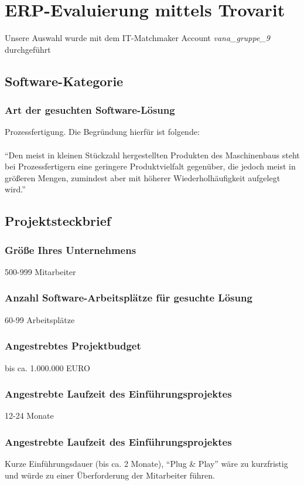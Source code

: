 \section{ERP-Evaluierung mittels Trovarit}
Unsere Auswahl wurde mit dem IT-Matchmaker Account \textit{vana\_gruppe\_9} durchgeführt


\subsection{Software-Kategorie}
\subsubsection{Art der gesuchten Software-Lösung}
\label{sssec_art}
Prozessfertigung. Die Begründung hierfür ist folgende:\\\\
\enquote{Den meist in kleinen Stückzahl hergestellten Produkten des Maschinenbaus steht bei Prozessfertigern eine geringere Produktvielfalt gegenüber, die jedoch meist in größeren Mengen, zumindest aber mit höherer Wiederholhäufigkeit aufgelegt wird.} \cite{trovarit_prozessfertigung}

\subsection{Projektsteckbrief}
\subsubsection{Größe Ihres Unternehmens}
500-999 Mitarbeiter
\subsubsection{Anzahl Software-Arbeitsplätze für gesuchte Lösung}
60-99 Arbeitsplätze
\subsubsection{Angestrebtes Projektbudget}
bis ca. 1.000.000 EURO
\subsubsection{Angestrebte Laufzeit des Einführungsprojektes}
12-24 Monate
\subsubsection{Angestrebte Laufzeit des Einführungsprojektes}
Kurze Einführungsdauer (bis ca. 2 Monate), \enquote{Plug \& Play} wäre zu kurzfristig und würde zu einer Überforderung der Mitarbeiter führen.
